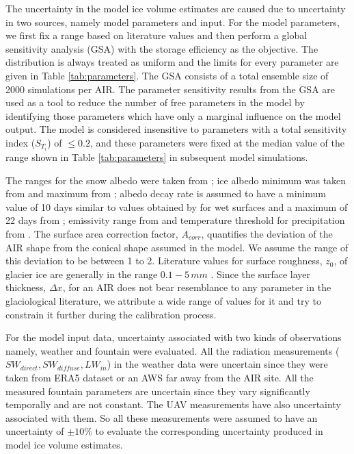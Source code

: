 \documentclass[utf8]{frontiersSCNS} %
\begin{document}
The uncertainty in the model ice volume estimates are caused due to uncertainty in two sources, namely model
parameters and input. For the model parameters, we first fix a range based on literature values and then perform a
global sensitivity analysis (GSA) with the storage efficiency as the objective. The distribution is always treated
as uniform and the limits for every parameter are given in Table \ref{tab:parameters}. The GSA consists of a total
ensemble size of 2000 simulations per AIR. The parameter sensitivity results from the GSA are used as a tool to
reduce the number of free parameters in the model by identifying those parameters which have only a marginal
influence on the model output. The model is considered insensitive to parameters with a total sensitivity index
($S_{T_{i}}$) of $\leq 0.2$, and these parameters were fixed at the median value of the range shown in Table
\ref{tab:parameters} in subsequent model simulations.

The ranges for the snow albedo were taken from \cite{ZollesMaussion_2019}; ice albedo minimum was taken from
\cite{steiner_2015} and maximum from \cite{ZollesMaussion_2019}; albedo decay rate is assumed to have a minimum
value of 10 days similar to values obtained by \cite{Schmidt_2017} for wet surfaces and a maximum of 22 days from
\cite{OerlemansKnap_1998}; emissivity range from \cite{steiner_2015} and temperature threshold for precipitation
from \cite{Zhou_2010}. The surface area correction factor, $A_{corr}$, quantifies the deviation of the AIR shape
from the conical shape assumed in the model. We assume the range of this deviation to be between 1 to 2. Literature
values for surface roughness, $z_{0}$, of glacier ice are generally in the range $0.1-5\, mm$
\citet{BrockWillisSharp_2006}. Since the surface layer thickness, $\Delta x$, for an AIR does not bear resemblance
to any parameter in the glaciological literature, we attribute a wide range of values for it and try to constrain
it further during the calibration process.

For the model input data, uncertainty associated with two kinds of observations namely, weather and fountain were
evaluated. All the radiation measurements ($SW_{direct}, SW_{diffuse}, LW_{in}$) in the weather data were uncertain
since they were taken from ERA5 dataset or an AWS far away from the AIR site. All the measured fountain parameters are
uncertain since they vary significantly temporally and are not constant. The UAV measurements have also uncertainty
associated with them. So all these measurements were assumed to have an uncertainty of $\pm 10 \%$ to evaluate the
corresponding uncertainty produced in model ice volume estimates.
\end{document}
